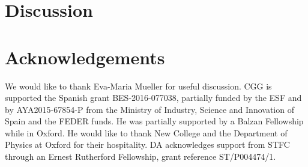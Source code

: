 \documentclass[useAMS,usenatbib]{mn2e}
\begin{document}


\section{Discussion}\label{sec:discussion}


\section*{Acknowledgements}
We would like to thank Eva-Maria Mueller for useful discussion. CGG is
supported the Spanish grant BES-2016-077038, partially funded by the ESF and by
AYA2015-67854-P from the Ministry of Industry, Science and Innovation of Spain
and the FEDER funds. He was partially supported by a Balzan Fellowship while
in Oxford. He would like to thank New College and the Department of Physics at
Oxford for their hospitality. DA acknowledges support from STFC through an
Ernest Rutherford Fellowship, grant reference ST/P004474/1.

\setlength{\bibhang}{2.0em}
\setlength{}

\end{document}
